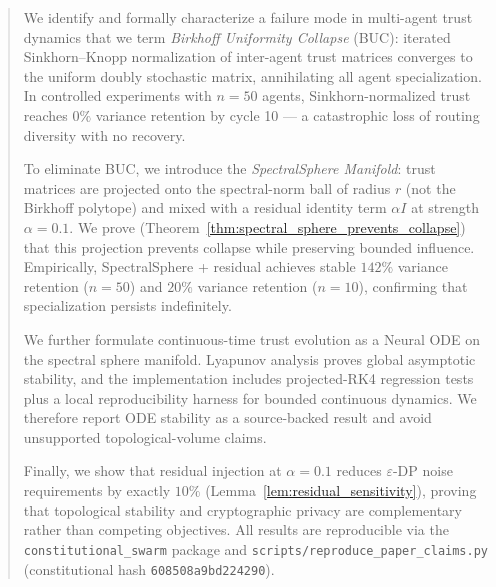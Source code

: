 \begin{abstract}
We identify and formally characterize a failure mode in multi-agent trust dynamics that
we term \emph{Birkhoff Uniformity Collapse} (BUC): iterated Sinkhorn--Knopp
normalization of inter-agent trust matrices converges to the uniform doubly stochastic
matrix, annihilating all agent specialization. In controlled experiments with $n{=}50$
agents, Sinkhorn-normalized trust reaches $0\%$ variance retention by cycle 10 — a
catastrophic loss of routing diversity with no recovery.

To eliminate BUC, we introduce the \emph{SpectralSphere Manifold}: trust matrices are
projected onto the spectral-norm ball of radius $r$ (not the Birkhoff polytope) and
mixed with a residual identity term $\alpha I$ at strength $\alpha{=}0.1$. We prove
(Theorem~\ref{thm:spectral_sphere_prevents_collapse}) that this projection prevents
collapse while preserving bounded influence. Empirically, SpectralSphere + residual
achieves stable $142\%$ variance retention ($n{=}50$) and $20\%$ variance retention
($n{=}10$), confirming that specialization persists indefinitely.

We further formulate continuous-time trust evolution as a Neural ODE on the spectral
sphere manifold. Lyapunov analysis proves global asymptotic stability, and the
implementation includes projected-RK4 regression tests plus a local reproducibility
harness for bounded continuous dynamics. We therefore report ODE stability as a
source-backed result and avoid unsupported topological-volume claims.

Finally, we show that residual injection at $\alpha{=}0.1$ reduces $\varepsilon$-DP
noise requirements by exactly $10\%$ (Lemma~\ref{lem:residual_sensitivity}), proving
that topological stability and cryptographic privacy are complementary rather than
competing objectives. All results are reproducible via the
\texttt{constitutional\_swarm} package and \texttt{scripts/reproduce\_paper\_claims.py}
(constitutional hash
\texttt{608508a9bd224290}).
\end{abstract}

